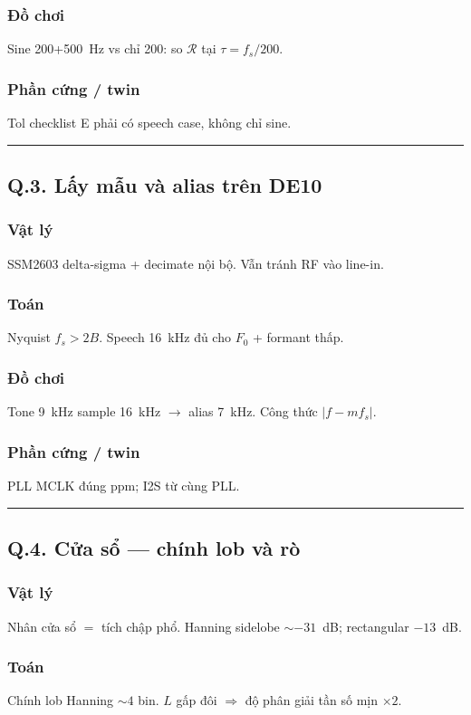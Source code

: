 \subsubsection*{Đồ chơi}
Sine 200+500~Hz vs chỉ 200: so $\mathcal{R}$ tại $\tau=f_s/200$.
\subsubsection*{Phần cứng / twin}
Tol checklist E phải có speech case, không chỉ sine.
\vspace{0.25cm}\hrule\vspace{0.25cm}
\subsection*{Q.3. Lấy mẫu và alias trên DE10}
\subsubsection*{Vật lý}
SSM2603 delta-sigma + decimate nội bộ. Vẫn tránh RF vào line-in.
\subsubsection*{Toán}
Nyquist $f_s>2B$. Speech 16~kHz đủ cho $F_0$ + formant thấp.
\subsubsection*{Đồ chơi}
Tone 9~kHz sample 16~kHz $\to$ alias 7~kHz. Công thức $|f-mf_s|$.
\subsubsection*{Phần cứng / twin}
PLL MCLK đúng ppm; I2S từ cùng PLL.
\vspace{0.25cm}\hrule\vspace{0.25cm}
\subsection*{Q.4. Cửa sổ --- chính lob và rò}
\subsubsection*{Vật lý}
Nhân cửa sổ $=$ tích chập phổ. Hanning sidelobe $\sim-31$~dB; rectangular $-13$~dB.
\subsubsection*{Toán}
Chính lob Hanning $\sim4$ bin. $L$ gấp đôi $\Rightarrow$ độ phân giải tần số mịn $\times2$.
